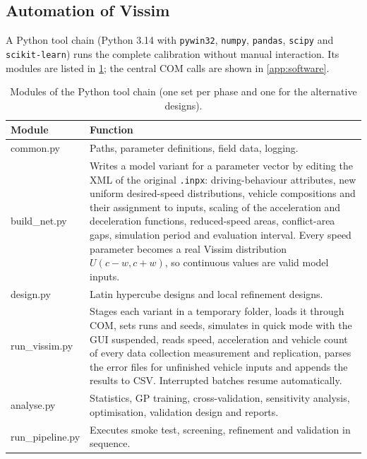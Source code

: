 \documentclass[11pt,a4paper]{article}
\newcommand{\code}[1]{\texttt{#1}}
\begin{document}
\subsection{Automation of Vissim}
\label{sec:automation}

A Python tool chain (Python 3.14 with \code{pywin32}, \code{numpy}, \code{pandas}, \code{scipy}
and \code{scikit-learn}) runs the complete calibration without manual interaction. Its modules are
listed in \cref{tab:modules}; the central COM calls are shown in \cref{app:software}.

\begin{table}[!htb]
\centering
\caption[Modules of the Python tool chain]{Modules of the Python tool chain (one set per phase and
one for the alternative designs).}
\label{tab:modules}
\small
\begin{tabularx}{\textwidth}{>{\ttfamily}lX}
\toprule
\textrm{\textbf{Module}} & \textbf{Function}\\
\midrule
common.py & Paths, parameter definitions, field data, logging.\\
build\_net.py & Writes a model variant for a parameter vector by editing the XML of the original
\code{.inpx}: driving-behaviour attributes, new uniform desired-speed distributions, vehicle
compositions and their assignment to inputs, scaling of the acceleration and deceleration
functions, reduced-speed areas, conflict-area gaps, simulation period and evaluation interval.
Every speed parameter becomes a real Vissim distribution $U(c-w, c+w)$, so continuous values are
valid model inputs.\\
design.py & Latin hypercube designs and local refinement designs.\\
run\_vissim.py & Stages each variant in a temporary folder, loads it through COM, sets runs and
seeds, simulates in quick mode with the GUI suspended, reads speed, acceleration and vehicle count
of every data collection measurement and replication, parses the error files for unfinished
vehicle inputs and appends the results to CSV. Interrupted batches resume automatically.\\
analyse.py & Statistics, GP training, cross-validation, sensitivity analysis, optimisation,
validation design and reports.\\
run\_pipeline.py & Executes smoke test, screening, refinement and validation in sequence.\\
\bottomrule
\end{tabularx}
\end{table}
\end{document}
